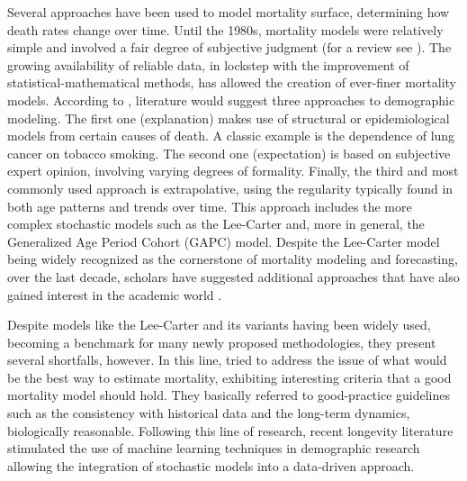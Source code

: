 \documentclass[fleqn,10pt]{wlscirep}
\begin{document}
Several approaches have been used to model mortality surface, determining how death rates change over time. Until the 1980s, mortality models were relatively simple and involved a fair degree of subjective judgment (for a review see \cite{Pollard}). The growing availability of reliable data, in lockstep with the improvement of statistical-mathematical methods, has allowed the creation of ever-finer mortality models. According to \cite{Booth}, literature would suggest three approaches to demographic modeling. The first one (explanation) makes use of structural or epidemiological models from certain causes of death. A classic example is the dependence of lung cancer on tobacco smoking. The second one (expectation) is based on subjective expert opinion, involving varying degrees of formality. Finally, the third and most commonly used approach is extrapolative, using the regularity typically found in both age patterns and trends over time.
This approach includes the more complex stochastic models such as the Lee-Carter \cite{LC92} and, more in general, the Generalized Age Period Cohort (GAPC) model. Despite the Lee-Carter model being widely recognized as the cornerstone of mortality modeling and forecasting, over the last decade, scholars have suggested additional approaches that have also gained interest in the academic world \cite{BDV2002,RH,CBD06,CBD09}.

Despite models like the Lee-Carter and its variants having been widely used, becoming a benchmark for many newly proposed methodologies, they present several shortfalls, however. 
In this line, \cite{CBD08} tried to address the issue of what would be the best way to estimate mortality, exhibiting interesting criteria that a good mortality model should hold. They basically referred to good-practice guidelines such as the consistency with historical data and the long-term dynamics, biologically reasonable. Following this line of research, recent longevity literature stimulated the use of machine learning techniques in demographic research allowing the integration of stochastic models into a data-driven approach. 
\end{document}
